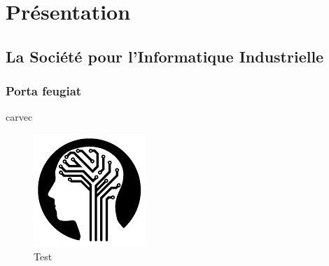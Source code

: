 \chapter{Présentation}
	\section{La Société pour l'Informatique Industrielle}
		\subsection{Porta feugiat}
		
			\cite{mscoco}
			\gls{carvec}

			\lipsum[2]
			
			\begin{figure}[h]
				\centering
				\includegraphics[page=1,width=.3\textwidth]{figures/test.pdf}
				\caption{Test}
				\label{fig:Test}
			\end{figure}
			
			\lipsum[3]

